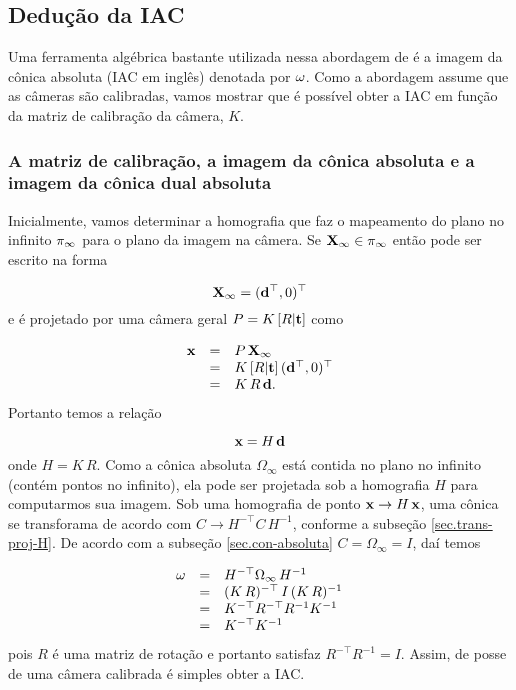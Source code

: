 \subsection{Dedução da IAC}

Uma ferramenta algébrica bastante utilizada nessa abordagem de \citep{2503343} é a imagem da cônica absoluta (IAC em inglês) denotada por ${\bf \omega}$. Como a abordagem assume que as câmeras são calibradas, vamos mostrar que é possível obter a IAC em função da matriz de calibração da câmera, $K$.

\subsubsection{A matriz de calibração, a imagem da cônica absoluta e a imagem da cônica dual absoluta}\label{sec.omega-calibracao}

 Inicialmente, vamos determinar a homografia que faz o mapeamento do plano no infinito $\pi_\infty$ para o plano da imagem na câmera. Se $\mathbf{X}_\infty\in\pi_\infty$ então pode ser escrito na forma

\begin{equation*}
\mathbf{X}_\infty=({\bf d}^\top,0)^\top
\end{equation*} 
e é projetado por uma câmera geral $P=K\,[R|{\bf t}]$ como

\begin{equation*}
\begin{array}{rcl}
\mathbf{x}&=&P\,\mathbf{X}_\infty\\
&=&K\,[R|{\bf t}]\,({\bf d}^\top,0)^\top\\
&=&K\,R\,{\bf d}.
\end{array}
\end{equation*}
Portanto temos a relação

\begin{equation*}
\mathbf{x}=H\,{\bf d}
\end{equation*}
onde $H=K\,R$. Como a cônica absoluta $\Omega_\infty$ está contida no plano no infinito (contém pontos no infinito), ela pode ser projetada sob a homografia $H$ para computarmos sua imagem.
Sob uma homografia de ponto $\mathbf{x}\rightarrow H\,\mathbf{x}$, uma cônica se transforama de acordo com $C\rightarrow H^{-\top} C\,H^{-1}$, conforme a subseção \ref{sec.trans-proj-H}. De acordo com a subseção \ref{sec.con-absoluta} $C=\Omega_\infty =I$, daí temos

\begin{equation*}
\begin{array}{rcl}
{\bf \omega}&=&H^{-\top}\Omega_\infty\,H^{-1}\\
&=&(K\,R)^{-\top}\,I\,(K\,R)^{-1}\\
&=&K^{-\top}R^{-\top}R^{-1}K^{-1}\\
&=&K^{-\top}K^{-1}
\end{array}
\end{equation*}
pois $R$ é uma matriz de rotação e portanto satisfaz $R^{-\top}R^{-1}=I$. Assim, de posse de uma câmera calibrada é simples obter a IAC.

